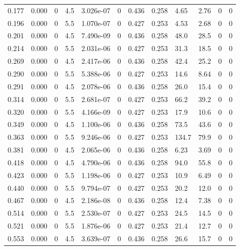 \documentclass[preview]{standalone}
\begin{document}
{{\begin{tabular}{L{1.2cm}C{1.2cm} C{0.3cm}C{0.5cm} C{1.4cm}C{1.4cm} C{1.4cm}C{1.4cm} C{1.6cm}C{1.6cm} C{1.6cm}C{1.6cm}}
  0.177  &  0.000  & 0     & 4.5 &  3.026e-07  & 0  &  0.436&   0.258& 4.65 & 2.76   &  0 & 0  \\ 
  0.196  &  0.000  & 0     & 5.5 &  1.070e-07  & 0  &  0.427&   0.253& 4.53 & 2.68   &  0 & 0  \\ 
  0.201  &  0.000  & 0     & 4.5 &  7.490e-09  & 0  &  0.436&   0.258& 48.0 & 28.5   &  0 & 0  \\ 
  0.214  &  0.000  & 0     & 5.5 &  2.031e-06  & 0  &  0.427&   0.253& 31.3 & 18.5   &  0 & 0  \\ 
  0.269  &  0.000  & 0     & 4.5 &  2.417e-06  & 0  &  0.436&   0.258& 42.4 & 25.2   &  0 & 0  \\ 
  0.290  &  0.000  & 0     & 5.5 &  5.388e-06  & 0  &  0.427&   0.253& 14.6 & 8.64   &  0 & 0  \\ 
  0.291  &  0.000  & 0     & 4.5 &  2.078e-06  & 0  &  0.436&   0.258& 26.0 & 15.4   &  0 & 0  \\ 
  0.314  &  0.000  & 0     & 5.5 &  2.681e-07  & 0  &  0.427&   0.253& 66.2 & 39.2   &  0 & 0  \\ 
  0.320  &  0.000  & 0     & 5.5 &  4.166e-09  & 0  &  0.427&   0.253& 17.9 & 10.6   &  0 & 0  \\ 
  0.349  &  0.000  & 0     & 4.5 &  1.100e-06  & 0  &  0.436&   0.258& 73.5 & 43.6   &  0 & 0  \\ 
  0.363  &  0.000  & 0     & 5.5 &  9.246e-06  & 0  &  0.427&   0.253& 134.7 & 79.9   &  0 & 0  \\ 
  0.381  &  0.000  & 0     & 4.5 &  2.065e-06  & 0  &  0.436&   0.258& 6.23 & 3.69   &  0 & 0  \\ 
  0.418  &  0.000  & 0     & 4.5 &  4.790e-06  & 0  &  0.436&   0.258& 94.0 & 55.8   &  0 & 0  \\ 
  0.423  &  0.000  & 0     & 5.5 &  1.198e-06  & 0  &  0.427&   0.253& 10.9 & 6.49   &  0 & 0  \\ 
  0.440  &  0.000  & 0     & 5.5 &  9.794e-07  & 0  &  0.427&   0.253& 20.2 & 12.0   &  0 & 0  \\ 
  0.467  &  0.000  & 0     & 4.5 &  2.186e-08  & 0  &  0.436&   0.258& 12.4 & 7.38   &  0 & 0  \\ 
  0.514  &  0.000  & 0     & 5.5 &  2.530e-07  & 0  &  0.427&   0.253& 24.5 & 14.5   &  0 & 0  \\ 
  0.521  &  0.000  & 0     & 5.5 &  1.876e-06  & 0  &  0.427&   0.253& 21.4 & 12.7   &  0 & 0  \\ 
  0.553  &  0.000  & 0     & 4.5 &  3.639e-07  & 0  &  0.436&   0.258& 26.6 & 15.7   &  0 & 0  \\ 

\end{tabular}}}
\end{document}

